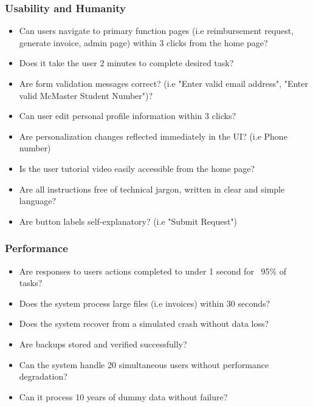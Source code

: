 \documentclass[12pt, titlepage]{article}
\begin{document}
\subsubsection{Usability and Humanity}
  \begin{itemize}[label=$\square$] %
    \item Can users navigate to primary function pages (i.e reimbursement request, generate invoice, admin page) within 3 clicks from the home page?
    \item Does it take the user 2 minutes to complete desired task?
    \item Are form validation messages correct? (i.e "Enter valid email address", "Enter valid McMaster Student Number")?
    \item Can user edit personal profile information within 3 clicks?
    \item Are personalization changes reflected immediately in the UI? (i.e Phone number)
    \item Is the user tutorial video easily accessible from the home page?
    \item Are all instructions free of technical jargon, written in clear and simple language?
    \item Are button labels self-explanatory? (i.e "Submit Request")
  \end{itemize}

\hypertarget{checklist-nfr12}{}
\subsubsection{Performance}
  \begin{itemize}[label=$\square$] %
    \item Are responses to users actions completed to under 1 second for ~95\% of tasks?
    \item Does the system process large files (i.e invoices) within 30 seconds?
    \item Does the system recover from a simulated crash without data loss?
    \item Are backups stored and verified successfully?
    \item Can the system handle 20 simultaneous users without performance degradation?
    \item Can it process 10 years of dummy data without failure?
  \end{itemize}

\hypertarget{checklist-nfr14}{}
\end{document}
